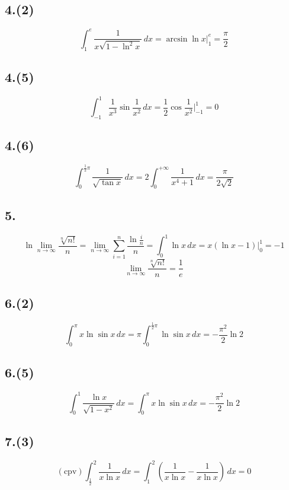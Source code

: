 \documentclass[12pt, a4paper, oneside]{ctexart}
\begin{document}
        \subsection*{4.(2)}
            $$
                \int_{1}^{e}\frac{1}{x\sqrt{1-\ln^2x}}\,dx=\arcsin{\ln x}|_{1}^{e}=\frac{\pi}{2}
            $$
        \subsection*{4.(5)}
            $$
                \int_{-1}^{1}\frac{1}{x^3}\sin\frac{1}{x^2}\,dx=\frac12\cos\frac{1}{x^2}|_{-1}^{1}=0
            $$
        \subsection*{4.(6)}
            $$
                \int_{0}^{\frac12\pi}\frac{1}{\sqrt{\tan x}}\,dx=2\int_{0}^{+\infty}\frac{1}{x^4+1}\,dx=\frac{\pi}{2\sqrt2}
            $$
        \subsection*{5.}
            $$
                \ln\lim_{n\to\infty}\frac{\sqrt[n]{n!}}{n}=\lim_{n\to\infty}\sum_{i=1}^n\frac{\ln\frac{i}{n}}{n}=\int_{0}^1\ln x\,dx=x(\ln x - 1)|^{1}_{0}=-1
            $$
            $$
                \lim_{n\to\infty}\frac{\sqrt[n]{n!}}{n}=\frac1e
            $$
        \subsection*{6.(2)}
            $$
                \int_{0}^{\pi}x\ln\sin x\,dx=\pi\int_{0}^{\frac12\pi}\ln\sin x\,dx=-\frac{\pi^2}{2}\ln2
            $$
        \subsection*{6.(5)}
            $$
                \int_{0}^{1}\frac{\ln x}{\sqrt{1-x^2}}\,dx=\int_{0}^{\pi}x\ln\sin x\,dx=-\frac{\pi^2}{2}\ln 2
            $$
        \subsection*{7.(3)}
            $$
                (\text{cpv})\int_{\frac12}^{2}\frac{1}{x\ln x}\,dx=\int_{1}^{2}(\frac{1}{x\ln x}-\frac{1}{x\ln x})\,dx=0
            $$
\end{document}
